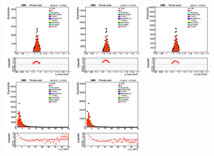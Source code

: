 \documentclass{cernatlasnote}
\begin{document}
    \begin{figure}[htp]
\centering
\includegraphics[width=0.32\textwidth]{images/emu_channel/2016/16_Range_0pt2_1pt8/Reco_L0_mass_M_wind_Linear.png}
\includegraphics[width=0.32\textwidth]{images/emu_channel/2017/17_Range_0pt2_1pt8/Reco_L0_mass_M_wind_Linear.png}
 \includegraphics[width=0.32\textwidth]{images/emu_channel/2018/18_Range_0pt2_1pt8/Reco_L0_mass_M_wind_Linear.png}\\
 \includegraphics[width=0.32\textwidth]{images/emu_channel/2016/16_Range_0pt2_1pt8/Reco_L0_pt_M_wind_Linear.png}
\includegraphics[width=0.32\textwidth]{images/emu_channel/2017/17_Range_0pt2_1pt8/Reco_L0_pt_M_wind_Linear.png}

\end{figure}
\end{document}
